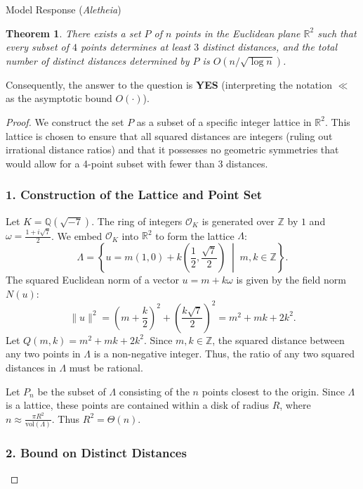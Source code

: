 \documentclass[11pt]{article}
\newtheorem{theorem}{Theorem}
\begin{document}
\begin{solution}{Model Response (\emph{Aletheia})}
\begin{theorem}
There exists a set $P$ of $n$ points in the Euclidean plane $\mathbb{R}^2$ such that every subset of $4$ points determines at least $3$ distinct distances, and the total number of distinct distances determined by $P$ is $O(n/\sqrt{\log n})$.
\end{theorem}

Consequently, the answer to the question is \textbf{YES} (interpreting the notation $\ll$ as the asymptotic bound $O(\cdot)$).

\begin{proof}
We construct the set $P$ as a subset of a specific integer lattice in $\mathbb{R}^2$. This lattice is chosen to ensure that all squared distances are integers (ruling out irrational distance ratios) and that it possesses no geometric symmetries that would allow for a 4-point subset with fewer than 3 distances.

\subsubsection*{1. Construction of the Lattice and Point Set}

Let $K = \mathbb{Q}(\sqrt{-7})$. The ring of integers $\mathcal{O}_K$ is generated over $\mathbb{Z}$ by $1$ and $\omega = \frac{1 + i\sqrt{7}}{2}$. We embed $\mathcal{O}_K$ into $\mathbb{R}^2$ to form the lattice $\Lambda$:
\[ \Lambda = \left\{ u = m(1, 0) + k\left(\frac{1}{2}, \frac{\sqrt{7}}{2}\right) \;\middle|\; m, k \in \mathbb{Z} \right\}. \]
The squared Euclidean norm of a vector $u = m + k\omega$ is given by the field norm $N(u)$:
\[ \|u\|^2 = \left(m + \frac{k}{2}\right)^2 + \left(\frac{k\sqrt{7}}{2}\right)^2 = m^2 + mk + 2k^2. \]
Let $Q(m, k) = m^2 + mk + 2k^2$. Since $m, k \in \mathbb{Z}$, the squared distance between any two points in $\Lambda$ is a non-negative integer. Thus, the ratio of any two squared distances in $\Lambda$ must be rational.

Let $P_n$ be the subset of $\Lambda$ consisting of the $n$ points closest to the origin. Since $\Lambda$ is a lattice, these points are contained within a disk of radius $R$, where $n \approx \frac{\pi R^2}{\text{vol}(\Lambda)}$. Thus $R^2 = \Theta(n)$.

\subsubsection*{2. Bound on Distinct Distances}


\end{proof}
\end{solution}
\end{document}
